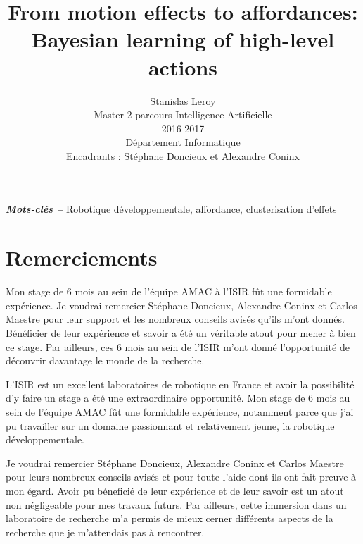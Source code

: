 \documentclass{llncs}
\providecommand{\keywords}[1]{\textbf{\textit{Mots-clés --}} #1}
\begin{document}
\title{From motion effects to affordances: Bayesian learning of high-level actions}

\author{Stanislas Leroy\\
   Master 2 parcours Intelligence Artificielle\\
   2016-2017\\
   Département Informatique\\
   Encadrants : Stéphane Doncieux et Alexandre Coninx}

\maketitle

\keywords{Robotique développementale, affordance, clusterisation d'effets}


\section*{Remerciements}

Mon stage de 6 mois au sein de l'équipe AMAC à l'ISIR fût une formidable expérience. Je voudrai remercier Stéphane Doncieux, Alexandre Coninx et Carlos Maestre pour leur support et les nombreux conseils avisés qu'ils m'ont donnés.
Bénéficier de leur expérience et savoir a été un véritable atout pour mener à bien ce stage. Par ailleurs, ces 6 mois au sein de l'ISIR m'ont donné l'opportunité de découvrir davantage le monde de la recherche.

L'ISIR est un excellent laboratoires de robotique en France et avoir la possibilité d'y faire un stage a été une extraordinaire opportunité. Mon stage de 6 mois au sein de l'équipe AMAC fût une formidable expérience, notamment parce que j'ai pu travailler sur un domaine passionnant et relativement jeune, la robotique développementale.

Je voudrai remercier Stéphane Doncieux, Alexandre Coninx et Carlos Maestre pour leurs nombreux conseils avisés et pour toute l'aide dont ils ont fait preuve à mon égard. Avoir pu béneficié de leur expérience et de leur savoir est un atout non négligeable pour mes travaux futurs. Par ailleurs, cette immersion dans un laboratoire de recherche m'a permis de mieux cerner différents aspects de la recherche que je m'attendais pas à rencontrer.
\end{document}
